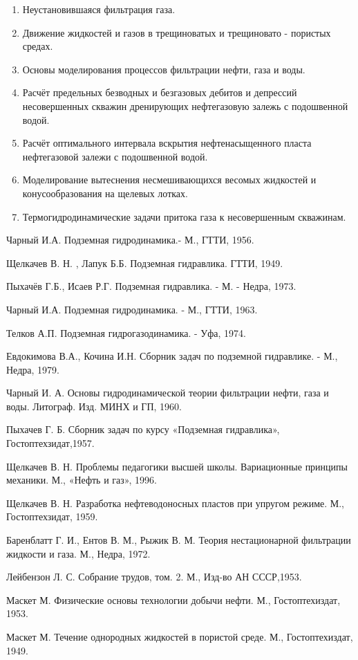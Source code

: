 \documentclass[12pt,a4paper]{article}
\begin{document}
\begin{enumerate}
		\item Неустановившаяся фильтрация газа.

		\item Движение жидкостей и газов в трещиноватых и трещиновато - пористых средах.

		\item Основы моделирования процессов фильтрации нефти, газа и воды.

		\item Расчёт предельных безводных и безгазовых дебитов и депрессий несовершенных скважин дренирующих нефтегазовую залежь с подошвенной водой.

		\item Расчёт оптимального интервала вскрытия нефтенасыщенного пласта нефтегазовой залежи с подошвенной водой.

		\item Моделирование вытеснения несмешивающихся весомых жидкостей и конусообразования на щелевых лотках.

		\item Термогидродинамические задачи притока газа к несовершенным скважинам.

	\end{enumerate}
	
	\begin{thebibliography}{99}

		\bibitem{} Чарный И.А. Подземная гидродинамика.- М., ГТТИ, 1956.

		\bibitem{} Щелкачев В. Н. , Лапук Б.Б. Подземная гидравлика. ГТТИ, 1949.

		\bibitem{} Пыхачёв Г.Б., Исаев Р.Г. Подземная гидравлика. - М. - Недра, 1973.

		\bibitem{} Чарный И.А. Подземная гидродинамика. - М., ГТТИ, 1963.

		\bibitem{} Телков А.П. Подземная гидрогазодинамика. - Уфа, 1974.

		\bibitem{} Евдокимова В.А., Кочина И.Н. Сборник задач по подземной гидравлике. - М., Недра, 1979.

		\bibitem{} Чарный И. А. Основы гидродинамической теории фильтрации нефти, газа и воды. Литограф. Изд. МИНХ и ГП, 1960.

		\bibitem{} Пыхачев Г. Б. Сборник задач по курсу «Подземная гидравлика», Гостоптехзидат,1957.

		\bibitem{} Щелкачев В. Н. Проблемы педагогики высшей школы. Вариационные принципы механики. М., «Нефть и газ», 1996.

		\bibitem{} Щелкачев В. Н. Разработка нефтеводоносных пластов при упругом режиме. М., Гостоптехзидат, 1959.

		\bibitem{} Баренблатт Г. И., Ентов В. М., Рыжик В. М. Теория нестационарной фильтрации жидкости и газа. М., Недра, 1972.

		\bibitem{} Лейбензон Л. С. Собрание трудов, том. 2. М., Изд-во АН СССР,1953.

		\bibitem{} Маскет М. Физические основы технологии добычи нефти. М., Гостоптехиздат, 1953.

		\bibitem{} Маскет М. Течение однородных жидкостей в пористой среде. М., Гостоптехиздат, 1949.

	\end{thebibliography}
\end{document}

